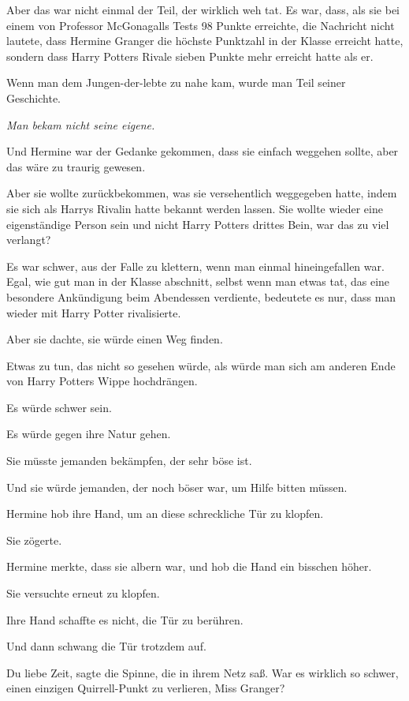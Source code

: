 Aber das war nicht einmal der Teil, der wirklich weh tat. Es war, dass, als sie
bei einem von Professor McGonagalls Tests 98 Punkte erreichte, die Nachricht
nicht lautete, dass Hermine Granger die höchste Punktzahl in der Klasse erreicht
hatte, sondern dass Harry Potters Rivale sieben Punkte mehr erreicht hatte als
er.

Wenn man dem Jungen-der-lebte zu nahe kam, wurde man Teil seiner Geschichte.

\emph{Man bekam nicht seine eigene.}

Und Hermine war der Gedanke gekommen, dass sie einfach weggehen sollte, aber das
wäre zu traurig gewesen.

Aber sie wollte zurückbekommen, was sie versehentlich weggegeben hatte, indem
sie sich als Harrys Rivalin hatte bekannt werden lassen. Sie wollte wieder eine
eigenständige Person sein und nicht Harry Potters drittes Bein, war das zu viel
verlangt?

Es war schwer, aus der Falle zu klettern, wenn man einmal hineingefallen war.
Egal, wie gut man in der Klasse abschnitt, selbst wenn man etwas tat, das eine
besondere Ankündigung beim Abendessen verdiente, bedeutete es nur, dass man
wieder mit Harry Potter rivalisierte.

Aber sie dachte, sie würde einen Weg finden.

Etwas zu tun, das nicht so gesehen würde, als würde man sich am anderen Ende von
Harry Potters Wippe hochdrängen.

Es würde schwer sein.

Es würde gegen ihre Natur gehen.

Sie müsste jemanden bekämpfen, der sehr böse ist.

Und sie würde jemanden, der noch böser war, um Hilfe bitten müssen.

Hermine hob ihre Hand, um an diese schreckliche Tür zu klopfen.

Sie zögerte.

Hermine merkte, dass sie albern war, und hob die Hand ein bisschen höher.

Sie versuchte erneut zu klopfen.

Ihre Hand schaffte es nicht, die Tür zu berühren.

Und dann schwang die Tür trotzdem auf.

\glqq{}Du liebe Zeit\grqq{}, sagte die Spinne, die in ihrem Netz saß. \glqq{}War
es wirklich so schwer, einen einzigen Quirrell-Punkt zu verlieren, Miss
Granger?\grqq{}

